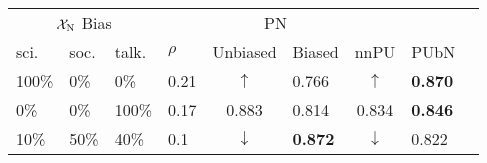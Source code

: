 \begin{tabular}{@{}lllllllll@{}}
  \toprule
  \multicolumn{3}{c}{$\mathcal{X}_{\textnormal{N}}$ Bias} &     & \multicolumn{2}{c}{PN} &       &      \\\cmidrule{1-3}\cmidrule{5-6}
  sci.   & soc.   & talk.       & $\rho$   & Unbiased                          & Biased          & nnPU                             & PUbN \\\midrule
  100\%  & 0\%    & 0\%         & 0.21     & \multicolumn{1}{c}{$\uparrow$}    & 0.766           & \multicolumn{1}{c}{$\uparrow$}   & \textbf{0.870}\\
  0\%    & 0\%    & 100\%       & 0.17     & \multicolumn{1}{c}{0.883}         & 0.814           & \multicolumn{1}{c}{0.834}        & \textbf{0.846} \\
  10\%   & 50\%   & 40\%        & 0.1      & \multicolumn{1}{c}{$\downarrow$}  & \textbf{0.872}  & \multicolumn{1}{c}{$\downarrow$} & 0.822 \\
  \bottomrule
\end{tabular}
